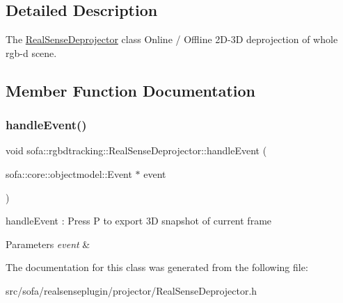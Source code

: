 \subsection{Detailed Description}
The \hyperlink{classsofa_1_1rgbdtracking_1_1_real_sense_deprojector}{Real\+Sense\+Deprojector} class Online / Offline 2\+D-\/3D deprojection of whole rgb-\/d scene. 

\subsection{Member Function Documentation}
\mbox{\label{classsofa_1_1rgbdtracking_1_1_real_sense_deprojector_aaa5648b58d79dcabc8265d7eec19b78a}} 
\subsubsection{\texorpdfstring{handle\+Event()}{handleEvent()}}
{\footnotesize\ttfamily void sofa\+::rgbdtracking\+::\+Real\+Sense\+Deprojector\+::handle\+Event (\begin{DoxyParamCaption}\item[{sofa\+::core\+::objectmodel\+::\+Event $\ast$}]{event }\end{DoxyParamCaption})\hspace{0.3cm}{\ttfamily [inline]}}



handle\+Event \+: Press P to export 3D snapshot of current frame 


\begin{DoxyParams}{Parameters}
{\em event} & \\
\hline
\end{DoxyParams}


The documentation for this class was generated from the following file\+:\begin{DoxyCompactItemize}
\item 
src/sofa/realsenseplugin/projector/Real\+Sense\+Deprojector.\+h\end{DoxyCompactItemize}
